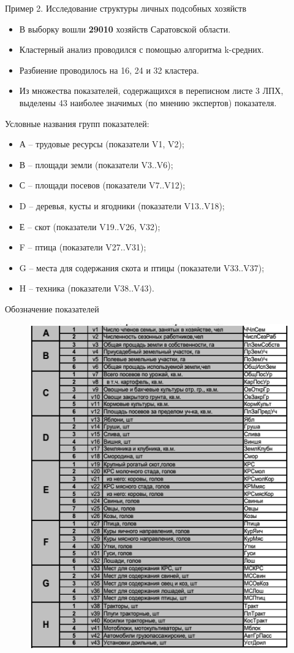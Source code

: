 \documentclass{beamer}
\begin{document}
\begin{frame}{Пример 2. Исследование структуры личных подсобных хозяйств}
\begin{itemize}
\item В выборку вошли \textbf{29010} хозяйств Саратовской области.
\item Кластерный анализ проводился с помощью алгоритма k-средних.
\item Разбиение проводилось на 16, 24 и 32 кластера. 
\item Из множества показателей, содержащихся в переписном листе 3 ЛПХ, выделены 43 наиболее значимых
(по мнению экспертов) показателя. 
\end{itemize}
Условные названия групп показателей:
\begin{itemize}
\item А – трудовые ресурсы (показатели V1, V2);
\item В – площади земли (показатели V3..V6);
\item С – площади посевов (показатели V7..V12);
\item D – деревья, кусты и ягодники (показатели V13..V18);
\item Е – скот (показатели V19..V26, V32);
\item F – птица (показатели V27..V31);
\item G – места для содержания скота и птицы (показатели V33..V37);
\item H – техника (показатели V38..V43).
\end{itemize}
\end{frame}

\begin{frame}
Обозначение показателей
\begin{figure}[h]
\centering
\includegraphics[scale=0.5]{images/lec07-pic42.png}
\end{figure}
\end{frame}
\end{document}
